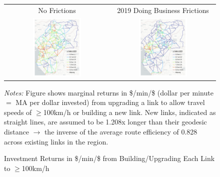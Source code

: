 \documentclass[a4paper]{article}
\begin{document}
\begin{figure}[H]  \vspace{-1mm}
\centering
\caption{\label{fig:MA_PUSD} Investment Returns in \$/min/\$ from Building/Upgrading Each Link to $\geq$100km/h}
\vspace{2mm}
\begin{tabular}{cc}
No Frictions & 2019 Doing Business Frictions \\
\includegraphics[width=0.48\textwidth]{"../figures/PE/trans_CEMAC_network_MA_gain_all_100kmh_pusd_google.pdf"} &
\includegraphics[width=0.48\textwidth]{"../figures/PE/trans_CEMAC_network_MA_gain_all_100kmh_pusd_bt_google.pdf"}  \\ [-0.2em]
\end{tabular}
\raggedright
\scriptsize 
\emph{Notes:} Figure shows marginal returns in \$/min/\$ (dollar per minute $=$ MA per dollar invested) from upgrading a link to allow travel speeds of $\geq$100km/h or building a new link. New links, indicated as straight lines, are assumed to be 1.208x longer than their geodesic distance $\to$ the inverse of the average route efficiency of 0.828 across existing links in the region.  
\end{figure}
\end{document}
